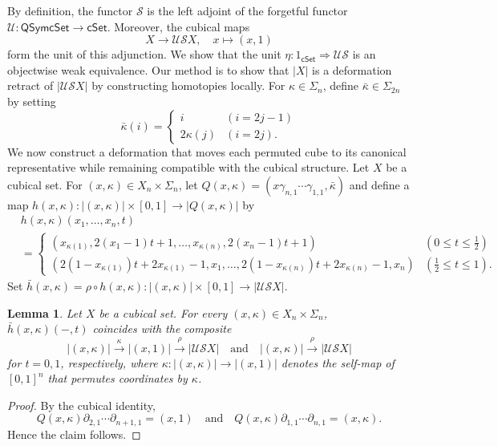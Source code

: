 \documentclass[oneside, 12pt]{amsart}
\numberwithin{equation}{section}
\theoremstyle{plain}
\newtheorem{lemma}[theorem]{Lemma}
\theoremstyle{definition}
\theoremstyle{remark}
\newcommand{\cSet}{\mathsf{cSet}}
\newcommand{\QSymcSet}{\mathsf{QSymcSet}}
\begin{document}
	By definition, the functor $\mathcal{S}$ is the left adjoint of the forgetful functor $\mathcal{U}\colon\QSymcSet\to\cSet$. Moreover, the cubical maps
	\[
	X\to\mathcal{U}\mathcal{S}X,\quad x\mapsto(x,1)
	\]
	form the unit of this adjunction. We show that the unit $\eta\colon 1_\cSet\Rightarrow\mathcal{US}$ is an objectwise weak equivalence. Our method is to show that $|X|$ is a deformation retract of $|\mathcal{US}X|$ by constructing homotopies locally. For $\kappa\in\Sigma_n$, define $\bar{\kappa}\in\Sigma_{2n}$ by setting
	\[
	\bar{\kappa}(i)=
	\begin{cases}
		i&(i=2j-1)\\
		2\kappa(j)&(i=2j).
	\end{cases}
	\]
	We now construct a deformation that moves each permuted cube to its canonical representative while remaining compatible with the cubical structure. Let $X$ be a cubical set. For $(x,\kappa)\in X_n\times\Sigma_n$, let $Q(x,\kappa)=(x\gamma_{n,1}\cdots\gamma_{1,1},\bar{\kappa})$ and define a map $h(x,\kappa)\colon|(x,\kappa)|\times[0,1]\to|Q(x,\kappa)|$ by
	\begin{align*}
		&h(x,\kappa)(x_1,\ldots,x_n,t)\\
		&=
		\begin{cases}
			(x_{\kappa(1)},2(x_1-1)t+1,\ldots,x_{\kappa(n)},2(x_n-1)t+1)&(0\le t\le\frac{1}{2})\\
			(2(1-x_{\kappa(1)})t+2x_{\kappa(1)}-1,x_1,\ldots,2(1-x_{\kappa(n)})t+2x_{\kappa(n)}-1,x_n)&(\frac{1}{2}\le t\le 1).
		\end{cases}
	\end{align*}
	Set $\bar{h}(x,\kappa)=\rho\circ h(x,\kappa)\colon|(x,\kappa)|\times[0,1]\to|\mathcal{US}X|$.
	
	
	
	\begin{lemma}
		\label{S t=0,1}
		Let $X$ be a cubical set. For every $(x,\kappa)\in X_n\times\Sigma_n$, $\bar{h}(x,\kappa)(-,t)$ coincides with the composite
		\[
		|(x,\kappa)|\xrightarrow{\kappa}|(x,1)|\xrightarrow{\rho}|\mathcal{US}X|\quad\text{and}\quad|(x,\kappa)|\xrightarrow{\rho}|\mathcal{US}X|
		\]
		for $t=0,1$, respectively, where $\kappa\colon|(x,\kappa)|\to|(x,1)|$ denotes the self-map of $[0,1]^n$ that permutes coordinates by $\kappa$.
	\end{lemma}
	
	\begin{proof}
		By the cubical identity,
		\[
		Q(x,\kappa)\partial_{2,1}\cdots\partial_{n+1,1}=(x,1)\quad\text{and}\quad Q(x,\kappa)\partial_{1,1}\cdots\partial_{n,1}=(x,\kappa).
		\]
		Hence the claim follows.
	\end{proof}
	
\end{document}
